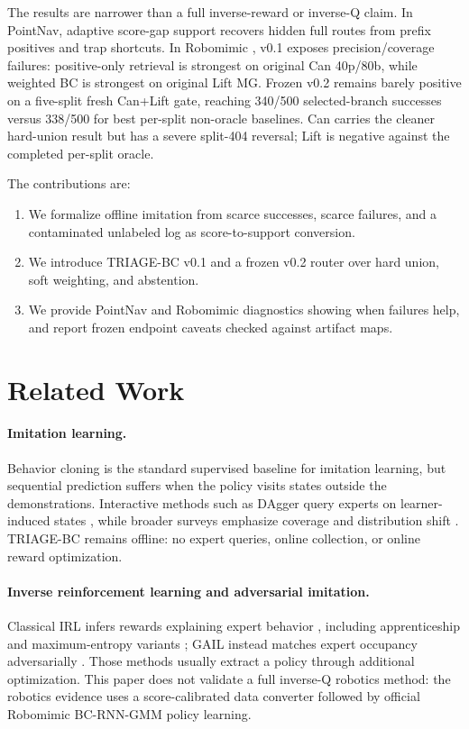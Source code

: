 \documentclass{article}
\newcommand{\method}{TRIAGE-BC}
\begin{document}
The results are narrower than a full inverse-reward or inverse-Q claim. In PointNav, adaptive score-gap support recovers hidden full routes from prefix positives and trap shortcuts. In Robomimic \cite{mandlekar2021robomimic}, v0.1 exposes precision/coverage failures: positive-only retrieval is strongest on original Can 40p/80b, while weighted BC is strongest on original Lift MG. Frozen v0.2 remains barely positive on a five-split fresh Can+Lift gate, reaching 340/500 selected-branch successes versus 338/500 for best per-split non-oracle baselines. Can carries the cleaner hard-union result but has a severe split-404 reversal; Lift is negative against the completed per-split oracle.

The contributions are:
\begin{enumerate}[leftmargin=*]
  \item We formalize offline imitation from scarce successes, scarce failures, and a contaminated unlabeled log as score-to-support conversion.
  \item We introduce \method{} v0.1 and a frozen v0.2 router over hard union, soft weighting, and abstention.
  \item We provide PointNav and Robomimic diagnostics showing when failures help, and report frozen endpoint caveats checked against artifact maps.
\end{enumerate}

\section{Related Work}

\paragraph{Imitation learning.}
Behavior cloning is the standard supervised baseline for imitation learning, but sequential prediction suffers when the policy visits states outside the demonstrations. Interactive methods such as DAgger query experts on learner-induced states \cite{ross2011dagger}, while broader surveys emphasize coverage and distribution shift \cite{osa2018algorithmic}. \method{} remains offline: no expert queries, online collection, or online reward optimization.

\paragraph{Inverse reinforcement learning and adversarial imitation.}
Classical IRL infers rewards explaining expert behavior \cite{ng2000irl}, including apprenticeship and maximum-entropy variants \cite{abbeel2004apprenticeship,ziebart2008maxent}; GAIL instead matches expert occupancy adversarially \cite{ho2016gail}. Those methods usually extract a policy through additional optimization. This paper does not validate a full inverse-Q robotics method: the robotics evidence uses a score-calibrated data converter followed by official Robomimic BC-RNN-GMM policy learning.
\end{document}
